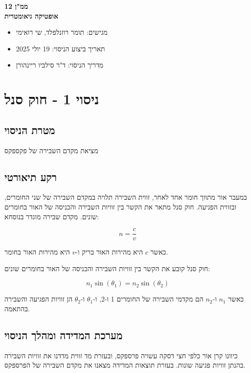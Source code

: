 \documentclass[14pt]{extarticle}
\begin{document}
\begin{center}
    {\LARGE \textbf{ממ"ן 12}}\\
    {\textbf{אופטיקה גיאומטרית}}
\end{center}

\begin{itemize}
    \item מגישים: תומר רוזנלפלד, שי רואימי
    \item תאריך ביצוע הניסוי: 19 יולי 2025
    \item מדריך הניסוי: ד"ר סילביו ריינהורן
\end{itemize}

\section*{ניסוי 1 - חוק סנל}
\subsection*{מטרת הניסוי}
מציאת מקדם השבירה של פקספקס 

\subsection*{רקע תיאורטי}
במעבר אור מתווך חומר אחד לאחר, זווית השבירה תלויה במקדם השבירה של שני החומרים, ובזווית הפגיעה.
חוק סנל מתאר את הקשר בין זוויות השבירה והכניסה של האור בחומרים שונים.
מקדם שבירה מוגדר בנוסחא:

\begin{equation}
    n = \frac{c}{v}
\end{equation}

כאשר $c$ היא מהירות האור בריק ו-$v$ היא מהירות האור בחומר.


חוק סנל קובע את הקשר בין זוויות השבירה והכניסה של האור בחומרים שונים:

\begin{equation}
n_1 \sin(\theta_1) = n_2 \sin(\theta_2)
\end{equation}

כאשר $n_1$ ו-$n_2$ הם מקדמי השבירה של החומרים 1 ו-2, ו-$\theta_1$ ו-$\theta_2$ הן זוויות הפגיעה והשבירה בהתאמה.

\subsection*{מערכת המדידה ומהלך הניסוי}

כיוונו קרן אור כלפי חצי דסקה עשויה פרספקס, ובעזרת מד זווית מדדנו את זוויות השבירה בהנתן זוויות פגיעה שונות. בעזרת תוצאות המדידה מצאנו את מקדם השבירה של הפרספקס.
\end{document}
